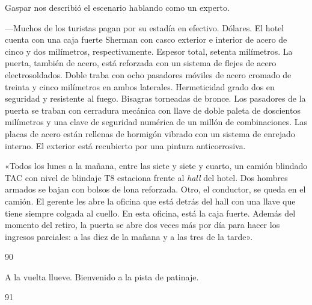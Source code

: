 \documentclass[12pt,twoside,openright,a5paper]{book}
\begin{document}
\nopagebreak

\vspace{0.5cm}

\nopagebreak

Gaspar nos describió el escenario hablando como un experto.

---Muchos de los turistas pagan por su estadía en efectivo. Dólares.
El hotel cuenta con una caja fuerte Sherman con casco exterior e interior de
acero de cinco y dos milímetros, respectivamente. Espesor total, setenta milímetros. La
puerta, también de acero, está reforzada con un sistema de flejes de
acero electrosoldados. Doble traba con ocho pasadores móviles de acero
cromado de treinta y cinco milímetros en ambos laterales. Hermeticidad grado
dos en seguridad y resistente al fuego. Bisagras torneadas de bronce. Los
pasadores de la puerta se traban con cerradura mecánica con llave de
doble paleta de doscientos milímetros y una clave de seguridad numérica de un
millón de combinaciones. Las placas de acero están rellenas de hormigón
vibrado con un sistema de enrejado interno. El exterior está recubierto por
una pintura anticorrosiva.

«Todos los lunes a la mañana, entre las siete y siete y cuarto, un camión blindado
TAC con nivel de blindaje T8 estaciona frente al \emph{hall} del hotel. Dos hombres
armados se bajan con bolsos de lona reforzada. Otro, el conductor, se queda
en el camión. El gerente les abre la oficina que está detrás del hall con
una llave que tiene siempre colgada al cuello. En esta oficina, está la
caja fuerte. Además del momento del retiro, la puerta se abre dos veces más
por día para hacer los ingresos parciales: a las diez de la mañana
y a las tres de la tarde».


\vspace{0.5cm}

\hrulefill \hspace{0.1cm}\decofourleft\hspace{0.2cm} 90 \hspace{0.2cm}\decofourright \hspace{0.1cm}\hrulefill

\nopagebreak

\vspace{0.5cm}

\nopagebreak

A la vuelta llueve. Bienvenido a la pista de patinaje.

\vspace{0.5cm}

\hrulefill \hspace{0.1cm}\decofourleft\hspace{0.2cm} 91 \hspace{0.2cm}\decofourright \hspace{0.1cm}\hrulefill
\end{document}
